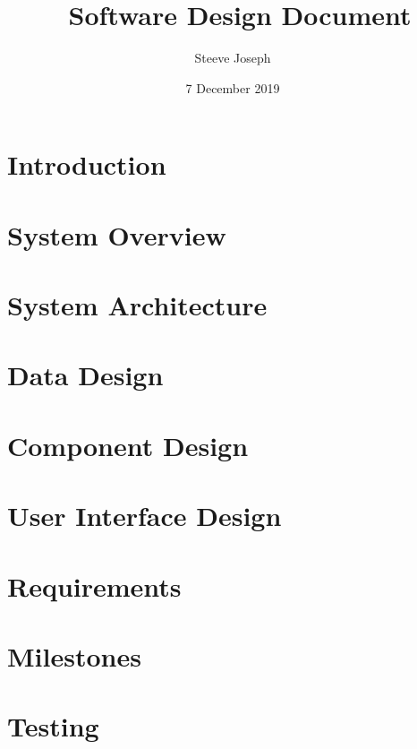 \documentclass[twoside]{report}
\title{\serviceName\ Software Design Document}
\author{Steeve Joseph}
\date{7 December 2019}
\begin{document}
\maketitle
\tableofcontents
\listoffigures
\listoftables


\chapter{Introduction}


\chapter{System Overview}


\chapter{System Architecture}


\chapter{Data Design}


\chapter{Component Design}


\chapter{User Interface Design}


\chapter{Requirements}


\chapter{Milestones}


\chapter{Testing}

\end{document}
